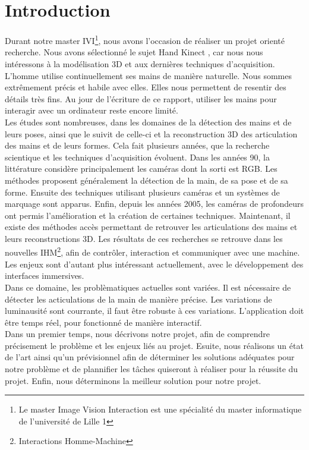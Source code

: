 \chapter*{Introduction}

Durant notre master IVI\footnote{Le master Image Vision Interaction est 
une spécialité du master informatique de l'université de Lille 1}, 
nous avons l'occasion de réaliser un projet orienté recherche. Nous avons 
sélectionné le sujet \og Hand Kinect \fg, car nous nous intéressons à la 
modélisation 3D et aux dernières techniques d'acquisition.\\

L'homme utilise continuellement ses mains de manière naturelle. Nous 
sommes extrêmement précis et habile avec elles. Elles nous permettent 
de resentir des détails très fins. Au jour de l'écriture de ce rapport,
utiliser les mains pour interagir avec un ordinateur reste encore limité.\\

Les études sont nombreuses, dans les domaines de la détection des mains 
et de leurs poses, ainsi que le suivit de celle-ci et la reconstruction 
3D des articulation des mains et de leurs formes. Cela fait plusieurs années, 
que la recherche scientique et les techniques d'acquisition évoluent. 
Dans les années 90, la littérature considère principalement les caméras 
dont la sorti est RGB. Les méthodes proposent généralement la détection 
de la main, de sa pose et de sa forme. Ensuite des techniques utilisant 
plusieurs caméras et un systèmes de marquage sont apparus. Enfin, depuis 
les années 2005, les caméras de profondeurs ont permis l'amélioration 
et la création de certaines techniques. Maintenant, il existe des méthodes 
accès permettant de retrouver les articulations des mains et leurs 
reconstructions 3D. Les résultats de ces recherches se retrouve dans les 
nouvelles IHM\footnote{Interactions Homme-Machine}, afin de contrôler, 
interaction et communiquer avec une machine. Les enjeux sont d'autant plus 
intéressant actuellement, avec le développement des interfaces 
immersives.\\

Dans ce domaine, les problèmatiques actuelles sont variées. Il est 
nécessaire de détecter les acticulations de la main de manière précise. 
Les variations de luminausité sont courrante, il faut être robuste à 
ces variations. L'application doit être temps réel, pour fonctionné de 
manière interactif.\\


Dans un premier temps, nous décrivons notre projet, afin de comprendre 
précisement le problème et les enjeux liés au projet. Esuite, nous réalisons 
un état de l'art ainsi qu'un prévisionnel afin de déterminer les solutions 
adéquates pour notre problème et de plannifier les tâches quiseront à 
réaliser pour la réussite du projet. Enfin, nous déterminons la meilleur 
solution pour notre projet.

